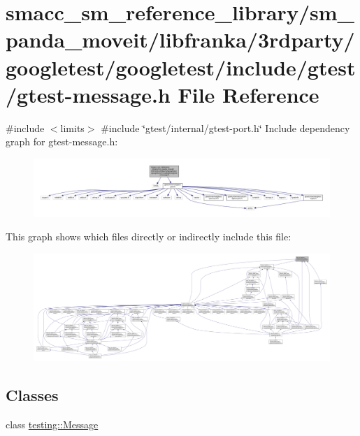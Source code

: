 \hypertarget{gtest-message_8h}{}\section{smacc\+\_\+sm\+\_\+reference\+\_\+library/sm\+\_\+panda\+\_\+moveit/libfranka/3rdparty/googletest/googletest/include/gtest/gtest-\/message.h File Reference}
\label{gtest-message_8h}
{\ttfamily \#include $<$limits$>$}\newline
{\ttfamily \#include \char`\"{}gtest/internal/gtest-\/port.\+h\char`\"{}}\newline
Include dependency graph for gtest-\/message.h\+:
\nopagebreak
\begin{figure}[H]
\begin{center}
\leavevmode
\includegraphics[width=350pt]{gtest-message_8h__incl}
\end{center}
\end{figure}
This graph shows which files directly or indirectly include this file\+:
\nopagebreak
\begin{figure}[H]
\begin{center}
\leavevmode
\includegraphics[width=350pt]{gtest-message_8h__dep__incl}
\end{center}
\end{figure}
\subsection*{Classes}
\begin{DoxyCompactItemize}
\item 
class \hyperlink{classtesting_1_1Message}{testing\+::\+Message}
\end{DoxyCompactItemize}
